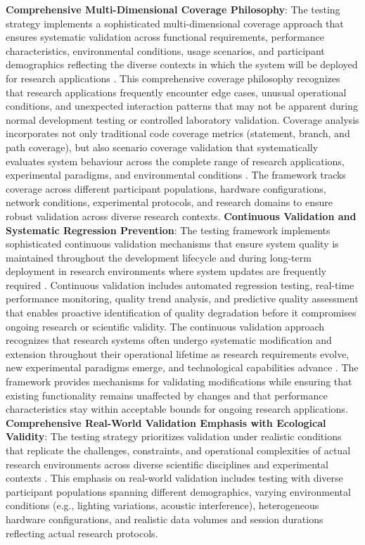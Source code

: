 \documentclass[11pt,a4paper]{report}
\begin{document}
\textbf{Comprehensive Multi-Dimensional Coverage Philosophy}: The testing strategy implements a sophisticated multi-dimensional coverage approach that ensures systematic validation across functional requirements, performance characteristics, environmental conditions, usage scenarios, and participant demographics reflecting the diverse contexts in which the system will be deployed for research applications \cite{Ammann2016}. This comprehensive coverage philosophy recognizes that research applications frequently encounter edge cases, unusual operational conditions, and unexpected interaction patterns that may not be apparent during normal development testing or controlled laboratory validation.
Coverage analysis incorporates not only traditional code coverage metrics (statement, branch, and path coverage), but also scenario coverage validation that systematically evaluates system behaviour across the complete range of research applications, experimental paradigms, and environmental conditions \cite{Zhu1997}. The framework tracks coverage across different participant populations, hardware configurations, network conditions, experimental protocols, and research domains to ensure robust validation across diverse research contexts.
\textbf{Continuous Validation and Systematic Regression Prevention}: The testing framework implements sophisticated continuous validation mechanisms that ensure system quality is maintained throughout the development lifecycle and during long-term deployment in research environments where system updates are frequently required \cite{Dustin1999}. Continuous validation includes automated regression testing, real-time performance monitoring, quality trend analysis, and predictive quality assessment that enables proactive identification of quality degradation before it compromises ongoing research or scientific validity.
The continuous validation approach recognizes that research systems often undergo systematic modification and extension throughout their operational lifetime as research requirements evolve, new experimental paradigms emerge, and technological capabilities advance \cite{Lehman1980}. The framework provides mechanisms for validating modifications while ensuring that existing functionality remains unaffected by changes and that performance characteristics stay within acceptable bounds for ongoing research applications.
\textbf{Comprehensive Real-World Validation Emphasis with Ecological Validity}: The testing strategy prioritizes validation under realistic conditions that replicate the challenges, constraints, and operational complexities of actual research environments across diverse scientific disciplines and experimental contexts \cite{Shadish2002}. This emphasis on real-world validation includes testing with diverse participant populations spanning different demographics, varying environmental conditions (e.g., lighting variations, acoustic interference), heterogeneous hardware configurations, and realistic data volumes and session durations reflecting actual research protocols.
\end{document}

